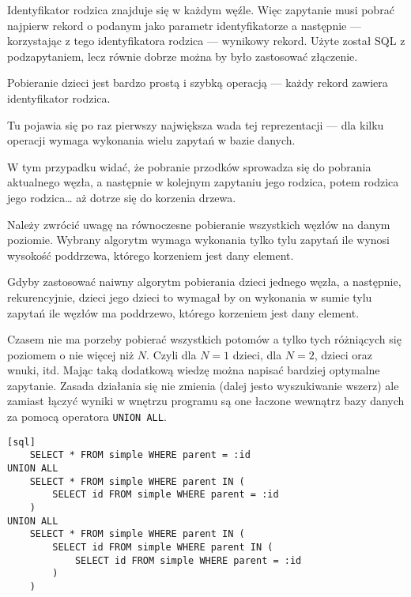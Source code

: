 
Identyfikator rodzica znajduje się w każdym węźle.
Więc zapytanie musi pobrać najpierw rekord o podanym jako parametr identyfikatorze a następnie
--- korzystając z tego identyfikatora rodzica --- wynikowy rekord.
Użyte został SQL z podzapytaniem, lecz równie dobrze można by było zastosować złączenie. 




Pobieranie dzieci jest bardzo prostą i szybką operacją
--- każdy rekord zawiera identyfikator rodzica.



Tu pojawia się po raz pierwszy największa wada tej reprezentacji --- 
dla kilku operacji wymaga wykonania wielu zapytań w bazie danych.

W tym przypadku widać, że pobranie przodków sprowadza się do pobrania aktualnego węzła,
a następnie w kolejnym zapytaniu jego rodzica,
potem rodzica jego rodzica\ldots
aż dotrze się do korzenia drzewa.






Należy zwrócić uwagę na równoczesne pobieranie wszystkich węzłów na danym poziomie.
Wybrany algorytm wymaga wykonania tylko tylu zapytań ile wynosi wysokość poddrzewa,
którego korzeniem jest dany element.


Gdyby zastosować naiwny algorytm pobierania dzieci jednego węzła,
a następnie, rekurencyjnie, dzieci jego dzieci
to wymagał by on wykonania w sumie tylu zapytań ile węzłów ma poddrzewo,
którego korzeniem jest dany element.

Czasem nie ma porzeby pobierać wszystkich potomów a tylko tych różniących się poziomem o nie więcej niż $N$.
Czyli dla $N = 1$ dzieci, dla $N = 2$, dzieci oraz wnuki, itd.
Mając taką dodatkową wiedzę można napisać bardziej optymalne zapytanie.
Zasada działania się nie zmienia (dalej jesto wyszukiwanie wszerz)
ale zamiast łączyć wyniki w wnętrzu programu są one łaczone wewnątrz bazy danych za pomocą operatora \texttt{UNION ALL}.

\begin{verbatim}[sql]
    SELECT * FROM simple WHERE parent = :id
UNION ALL 
    SELECT * FROM simple WHERE parent IN (
        SELECT id FROM simple WHERE parent = :id
    )
UNION ALL
    SELECT * FROM simple WHERE parent IN (
        SELECT id FROM simple WHERE parent IN (
            SELECT id FROM simple WHERE parent = :id
        )
    )
\end{verbatim}

